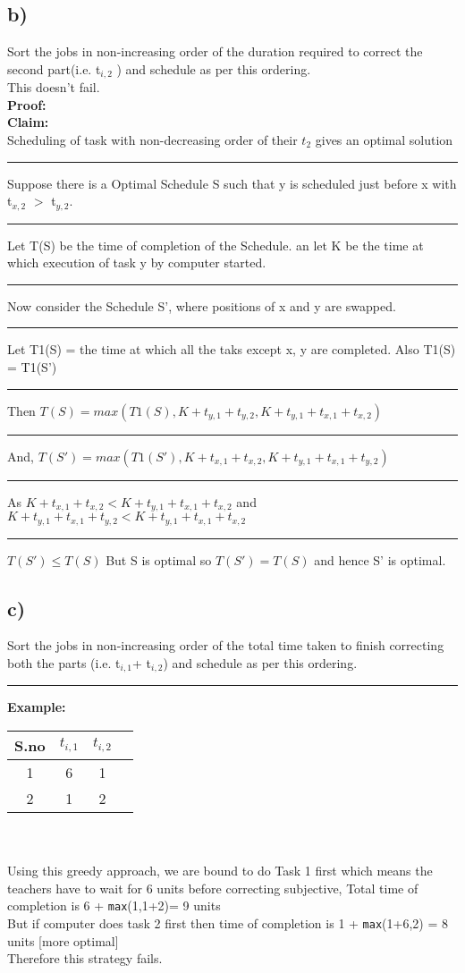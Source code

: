 \documentclass{report}
\begin{document}
 \subsection*{b)}
 Sort the jobs in non-increasing order of the duration required to correct the second part(i.e. t$_{i,2}$ ) and schedule as per this ordering.\\
 This doesn't fail.\\
 \textbf{Proof:}\\
 \textbf{Claim:}\\ Scheduling of task with non-decreasing order of their $t_2$ gives an optimal solution\\
 \noindent\rule[0.5mm]{1cm}{0pt} Suppose there is a Optimal Schedule S such that y is scheduled just before x with t$_{x,2}$ $>$ t$_{y,2}$.\\
 \noindent\rule[0.5mm]{1cm}{0pt} Let T(S) be the time of completion of the Schedule. an let K be the time at which execution of task y by computer started.\\
 \noindent\rule[0.5mm]{1cm}{0pt} Now consider the Schedule S', where positions of x and y are swapped.\\
 \noindent\rule[0.5mm]{1cm}{0pt} Let T1(S) = the time at which all the taks except x, y are completed.  Also T1(S) = T1(S')\\
 \noindent\rule[0.5mm]{1cm}{0pt} Then $T(S) = max(T1(S), K+t_{y,1}+t_{y,2}, K + t_{y,1} + t_{x,1} + t_{x,2})$\\
 \noindent\rule[0.5mm]{1cm}{0pt} And, $T(S') = max(T1(S'), K+t_{x,1}+t_{x,2}, K + t_{y,1} + t_{x,1} + t_{y,2})$\\
 \noindent\rule[0.5mm]{1cm}{0pt} As $K+t_{x,1}+t_{x,2} < K + t_{y,1} + t_{x,1} + t_{x,2}$ and $K + t_{y,1} + t_{x,1} + t_{y,2} < K + t_{y,1} + t_{x,1} + t_{x,2}$ \\
 \noindent\rule[0.5mm]{1cm}{0pt}$T(S') \leq T(S)$ But S is optimal so $T(S')=T(S)$ and hence S' is optimal.

 \subsection*{c)}
 Sort the jobs in non-increasing order of the total time taken to finish correcting both the parts (i.e. t$_{i,1}$+ t$_{i,2}$) and schedule as per this ordering.\\
 \noindent\rule[0.5mm]{4cm}{0pt}
 \textbf{Example:}
 \begin{tabular}{|c|c|c|c}
    \hline
      S.no &  $t_{i,1}$ & $t_{i,2}$\\
      \hline
      1 & 6 & 1\\ 
      2 & 1 & 2\\
      \hline
 \end{tabular}\\\vspace*{0.2em}\\
 Using this greedy approach, we are bound to do Task 1 first which means the teachers have to wait for 6 units before correcting subjective, Total time of completion is 6 + \texttt{max}(1,1+2)= 9 units\\
 But if computer does task 2 first then time of completion is 1 + \texttt{max}(1+6,2) = 8 units [more optimal] \\
 Therefore this strategy fails.
\end{document}
